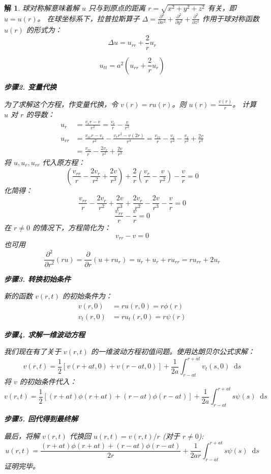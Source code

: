 \documentclass[12pt,a4paper]{article}
\newcommand{\diff}{\mathop{}\!\mathrm{d}}  %
\newtheorem*{solution}{解}
\begin{document}
\begin{solution}
	
	
	球对称解意味着解 $u$ 只与到原点的距离 $r = \sqrt{x^2+y^2+z^2}$ 有关，即 $u=u(r)$。
	在球坐标系下，拉普拉斯算子 $\Delta = \frac{\partial^2}{\partial x^2} + \frac{\partial^2}{\partial y^2} + \frac{\partial^2}{\partial z^2}$ 作用于球对称函数 $u(r)$ 的形式为：
	\[
	\Delta u = u_{rr} + \frac{2}{r} u_r
	\]
	
	\[
	u_{tt} = a^2 \left(u_{rr} + \frac{2}{r} u_r \right)
	\]
	
		
		\hrulefill
		
		\textbf{步骤2. 变量代换}
		
		\noindent
		为了求解这个方程，作变量代换，令 $v(r) = r u(r)$。则 $u(r) = \frac{v(r)}{r}$。
		计算 $u$ 对 $r$ 的导数：
		\begin{align*}
			u_r &= \frac{v_r r - v}{r^2} = \frac{v_r}{r} - \frac{v}{r^2} \\[6pt]
			u_{rr} &= \frac{v_{rr} r - v_r}{r^2} - \frac{v_r r^2 - v (2r)}{r^4} = \frac{v_{rr}}{r} - \frac{v_r}{r^2} - \frac{v_r}{r^2} + \frac{2v}{r^3} \\[6pt]
			&= \frac{v_{rr}}{r} - \frac{2v_r}{r^2} + \frac{2v}{r^3}
		\end{align*}
		将 $u, u_r, u_{rr}$ 代入原方程：
		\[
		\left( \frac{v_{rr}}{r} - \frac{2v_r}{r^2} + \frac{2v}{r^3} \right) + \frac{2}{r} \left( \frac{v_r}{r} - \frac{v}{r^2} \right) - \frac{v}{r} = 0
		\]
		化简得：
		\[
		\frac{v_{rr}}{r} - \frac{2v_r}{r^2} + \frac{2v}{r^3} + \frac{2v_r}{r^2} - \frac{2v}{r^3} - \frac{v}{r} = 0
		\]
		\[
		\frac{v_{rr}}{r} - \frac{v}{r} = 0
		\]
		在 $r \neq 0$ 的情况下，方程简化为：
		\[
		v_{rr} - v = 0
		\]
		也可用
		\begin{equation*}
			\frac{\partial^2}{\partial r^2}(ru) = \frac{\partial}{\partial r}(u + ru_r) = u_r + u_r + r u_{rr} = r u_{rr} + 2u_r
		\end{equation*}
		
		
		\hrulefill
		
		\textbf{步骤3. 转换初始条件}
		
		\noindent
		新的函数 $v(r,t)$ 的初始条件为：
		\begin{align*}
			v(r,0) &= r u(r,0) = r\phi(r) \\
			v_t(r,0) &= r u_t(r,0) = r\psi(r)
		\end{align*}
		
		\hrulefill
		
		\textbf{步骤4. 求解一维波动方程}
		
		\noindent
		我们现在有了关于 $v(r,t)$ 的一维波动方程初值问题。使用达朗贝尔公式求解：
		\[
		v(r,t) = \frac{1}{2} [v(r+at, 0) + v(r-at, 0)] + \frac{1}{2a} \int_{r-at}^{r+at} v_t(s,0) \diff s
		\]
		将 $v$ 的初始条件代入：
		\[
		v(r,t) = \frac{1}{2} [(r+at)\phi(r+at) + (r-at)\phi(r-at)] + \frac{1}{2a} \int_{r-at}^{r+at} s\psi(s) \diff s
		\]
		
		\hrulefill
		
		\textbf{步骤5. 回代得到最终解}
		
		\noindent
		最后，将解 $v(r,t)$ 代换回 $u(r,t) = v(r,t)/r$ (对于 $r \neq 0$):
		\[
		u(r,t) = \frac{(r+at)\phi(r+at) + (r-at)\phi(r-at)}{2r} + \frac{1}{2ar} \int_{r-at}^{r+at} s\psi(s) \diff s
		\]
	证明完毕。
	\end{solution}
	
\end{document}
